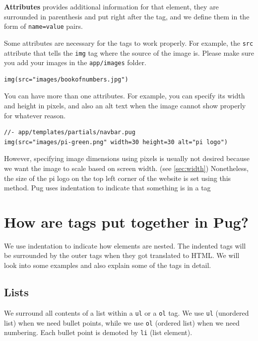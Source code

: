 \textbf{Attributes} provides additional information for that element, they are surrounded in parenthesis and put right after the tag, and we define them in the form of \texttt{name=value} pairs.

Some attributes are necessary for the tags to work properly. For example, the \texttt{src} attribute that tells the \texttt{img} tag where the source of the image is. Please make sure you add your images in the \texttt{app/images} folder.
\vspace{6mm}

\begin{lstlisting}[language=pug]
img(src="images/bookofnumbers.jpg")
\end{lstlisting}

You can have more than one attributes. For example, you can specify its width and height in pixels, and also an alt text when the image cannot show properly for whatever reason.

\begin{lstlisting}[language=pug]
//- app/templates/partials/navbar.pug
img(src="images/pi-green.png" width=30 height=30 alt="pi logo")
\end{lstlisting}

However, specifying image dimensions using pixels is usually not desired because we want the image to scale based on screen width. (see \cref{sec:width}) Nonetheless, the size of the pi logo on the top left corner of the website is set using this method.
Pug uses indentation to indicate that something is in a tag

\section{How are tags put together in Pug?}

We use indentation to indicate how elements are nested. The indented tags will be surrounded by the outer tags when they got translated to HTML. We will look into some examples and also explain some of the tags in detail. 

\subsection*{Lists}
\label{sec:list}

We surround all contents of a list within a \texttt{ul} or a \texttt{ol} tag. We use \texttt{ul} (unordered list) when we need bullet points, while we use \texttt{ol} (ordered list) when we need numbering. Each bullet point is demoted by \texttt{li} (list element).


